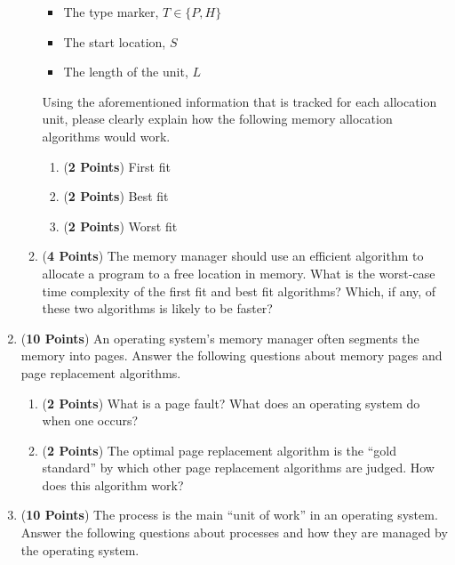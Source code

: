 \documentclass[12pt,epsf,psfig,graphics]{article}
\begin{document}
\begin{enumerate}
\begin{enumerate}
    \begin{itemize}
      \item The type marker, $T \in \{P, H\}$
      \item The start location, $S$
      \item The length of the unit, $L$
    \end{itemize}

    Using the aforementioned information that is tracked for each allocation unit, please clearly explain how the
    following memory allocation algorithms would work.

    \begin{enumerate}
      \item ({\bf 2 Points}) First fit
      \item ({\bf 2 Points}) Best fit
      \item ({\bf 2 Points}) Worst fit
    \end{enumerate}

  \item ({\bf 4 Points}) The memory manager should use an efficient algorithm to allocate a program to a free location in
    memory.  What is the worst-case time complexity of the first fit and best fit algorithms?  Which, if any, of these
    two algorithms is likely to be faster?

  \end{enumerate}

  \newpage

\item ({\bf 10 Points}) An operating system's memory manager often segments the memory into pages.  Answer the following
  questions about memory pages and page replacement algorithms.

  \begin{enumerate}

    \item ({\bf 2 Points}) What is a page fault? What does an operating system do when one occurs?

    \item ({\bf 2 Points}) The optimal page replacement algorithm is the ``gold standard'' by which other page
      replacement algorithms are judged.  How does this algorithm work? 
  
  \end{enumerate}

  \newpage
  
\item ({\bf 10 Points}) The process is the main ``unit of work'' in an operating system.  Answer the following questions
  about processes and how they are managed by the operating system.


\end{enumerate}
\end{document}
